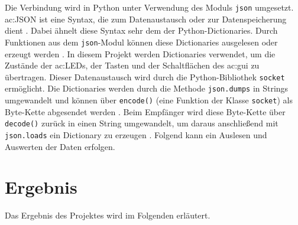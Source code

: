 Die Verbindung wird in Python unter Verwendung des Moduls \texttt{json} \cite{latex:json} umgesetzt. \gls{ac:JSON} ist eine Syntax, die zum Datenaustausch oder zur Datenspeicherung dient \cite{latex:json2}. Dabei ähnelt diese Syntax sehr dem der Python-Dictionaries. Durch Funktionen aus dem \texttt{json}-Modul können diese Dictionaries ausgelesen oder erzeugt werden \cite{latex:kofler}. In diesem Projekt werden Dictionaries verwendet, um die Zustände der \gls{ac:LED}s, der Tasten und der Schaltflächen des \gls{ac:gui} zu übertragen. Dieser Datenaustausch wird durch die Python-Bibliothek \texttt{socket} \cite{latex:socket} ermöglicht.
Die Dictionaries werden durch die Methode \texttt{json.dumps} in Strings umgewandelt \cite{latex:kofler} und können über \texttt{encode()} (eine Funktion der Klasse \texttt{socket}) als Byte-Kette abgesendet werden \cite{latex:socket2}.
Beim Empfänger wird diese Byte-Kette über \texttt{decode()} zurück in einen String umgewandelt, um daraus anschließend mit \texttt{json.loads}  ein Dictionary zu erzeugen \cite{latex:kofler}.
Folgend kann ein Auslesen und Auswerten der Daten erfolgen.\\

\chapter{Ergebnis}
Das Ergebnis des Projektes wird im Folgenden erläutert.

